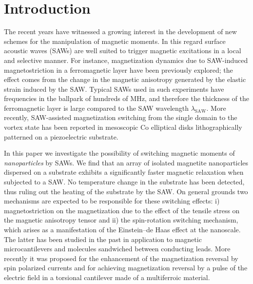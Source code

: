 \documentclass[aps,prb,floats,twocolumn]{revtex4}
\begin{document}
\section{Introduction}\label{introduction}
The recent years have witnessed a growing interest in the development of new schemes for the manipulation of magnetic moments. In this regard surface acoustic waves (SAWs) are well suited to trigger magnetic excitations in a local and selective manner.  For instance, magnetization dynamics due to SAW-induced magnetostriction in a ferromagnetic layer have been previously explored;\cite{Davis-APL2010,Kovalenko-PRL2013,Thevenard-PRB2013,Thevenard-PRB2014,Davis-JAP2015,Thevenard-PRB2016} the effect comes from the change in the magnetic anisotropy generated by the elastic strain induced by the SAW. Typical SAWs used in such experiments have frequencies in the ballpark of hundreds of MHz, and therefore the thickness of the ferromagnetic layer is large compared to the SAW wavelength $\lambda_{\textrm{SAW}}$. More recently, SAW-assisted magnetization switching from the single domain to the vortex state has been reported in mesoscopic Co elliptical disks lithographically patterned on a piezoelectric substrate.\cite{Sampath-Nano2016}

In this paper we investigate the possibility of switching magnetic moments of {\it nanoparticles} by SAWs. We find that an array of isolated magnetite nanoparticles dispersed on a substrate exhibits a significantly faster magnetic relaxation when subjected to a SAW. No temperature change in the substrate has been detected, thus ruling out the heating of the substrate by the SAW. On general grounds two mechanisms are expected to be responsible for these switching effects: i) magnetostriction on the magnetization due to the effect of the tensile stress on the magnetic anisotropy tensor and ii) the spin-rotation switching mechanism, which arises as a manifestation of the Einstein--de Haas effect at the nanoscale.\cite{chugarsch-PRB2005,garchu-PRB2015} The latter has been studied in the past in application to magnetic microcantilevers \cite{Kovalev-APL2003,Kovalev-PRL2005,Wallis-APL2006,jaachugar09prb,OKeeffe-PRB2013} and molecules sandwiched between conducting leads.\cite{JCG-EPL10} More recently it was proposed for the enhancement of the magnetization reversal by spin polarized currents\cite{Cai-PRB2014} and for achieving magnetization reversal by a pulse of the electric field in a torsional cantilever made of a multiferroic material.\cite{CJ-JAP2015}
\end{document}
